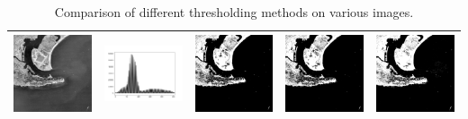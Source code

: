 \documentclass[11pt]{report}
\begin{document}
\begin{table}[htbp]
{\begin{tabular}{|c|c|c|c|c|}
        \includegraphics[width=5cm]{Satellite.png} & \includegraphics[width=5cm]{Satellite_Hist.png} & \includegraphics[width=5cm]{Satellite_Otsu.png} & \includegraphics[width=5cm]{Satellite_Isodata.png} & \includegraphics[width=5cm]{Satellite_Triangle.png} \\
        \hline
        \end{tabular}%
    }
    \caption{Comparison of different thresholding methods on various images.}
    \label{tab:thresholding_comparison}
    \end{table}
\end{document}
